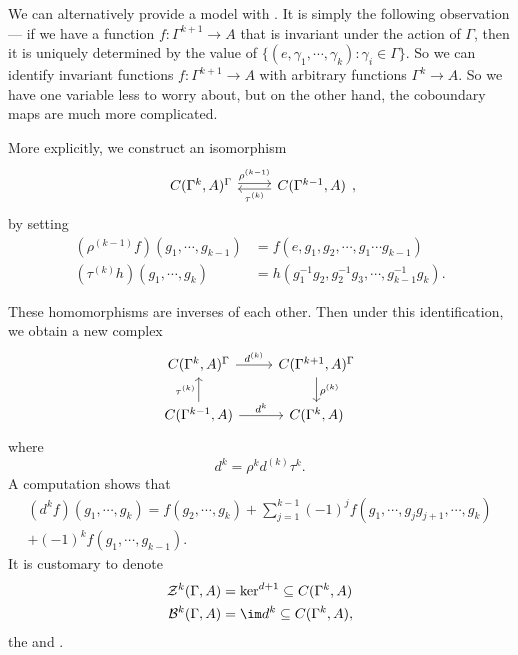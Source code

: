 \documentclass[a4paper]{article}
\begin{document}
We can alternatively provide a model with . It is simply the following observation --- if we have a function $f: \Gamma^{k + 1} \to A$ that is invariant under the action of $\Gamma$, then it is uniquely determined by the value of $\{(e, \gamma_1, \cdots, \gamma_k): \gamma_i \in \Gamma\}$. So we can identify invariant functions $f: \Gamma^{k + 1} \to A$ with arbitrary functions $\Gamma^k \to A$. So we have one variable less to worry about, but on the other hand, the coboundary maps are much more complicated.

More explicitly, we construct an isomorphism
\[
  \begin{tikzcd}
    C(\Gamma^k, A)^\Gamma \ar[r, yshift=2, "\rho^{(k - 1)}"] & C(\Gamma^{k - 1}, A)\ar[l, yshift=-2, "\tau^{(k)}"]
  \end{tikzcd},
\]
by setting
\begin{align*}
  (\rho^{(k - 1)} f)(g_1, \cdots, g_{k - 1}) &= f(e, g_1, g_2, \cdots, g_1 \cdots g_{k - 1})\\
  (\tau^{(k)} h)(g_1, \cdots, g_k) &= h (g_1^{-1} g_2, g_2^{-1} g_3, \cdots, g_{k - 1}^{-1} g_k).
\end{align*}

These homomorphisms are inverses of each other. Then under this identification, we obtain a new complex
\[
  \begin{tikzcd}
    C(\Gamma^k, A)^\Gamma \ar[r, "d^{(k)}"] & C(\Gamma^{k + 1}, A)^\Gamma \ar[d,"\rho^{(k)}"] \\
    C(\Gamma^{k - 1}, A) \ar[u, "\tau^{(k)}"] \ar[r, "d^{k}"] & C(\Gamma^k, A)
  \end{tikzcd}
\]
where
\[
  d^k = \rho^k d^{(k)} \tau^k.
\]
A computation shows that
\begin{align*}
  (d^k f) (g_1, \cdots, g_k) = f(g_2, \cdots, g_k) + \sum_{j = 1}^{k - 1} (-1)^j f(g_1, \cdots, g_j g_{j + 1}, \cdots, g_k) \\
  + (-1)^k f(g_1, \cdots, g_{k - 1}).
\end{align*}
It is customary to denote
\begin{align*}
  \mathcal{Z}^k(\Gamma, A) &= \ker^{d + 1} \subseteq C(\Gamma^k, A)\\
  \mathcal{B}^k (\Gamma, A) &= \im d^k \subseteq C(\Gamma^k, A),
\end{align*}
the  and .
\end{document}
